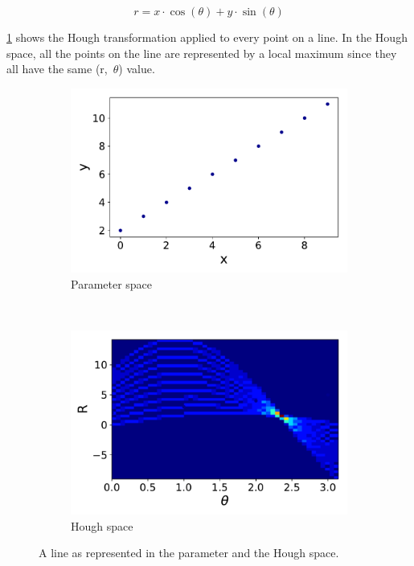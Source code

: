 \begin{equation}
	r = x \cdot \cos(\theta) + y \cdot \sin(\theta)
	\label{line_hesse}
\end{equation}

\cref{HTLine} shows the Hough transformation applied to every point on a line. In the Hough space, all the points on the line are represented by a local maximum since they all have the same (r,~$\theta$) value.
\begin{figure}[ht]
	\centering
	\begin{subfigure}[b]{0.45\textwidth}
        \includegraphics[width=\textwidth]{figures/line.pdf}
        \caption{Parameter space}
    \end{subfigure}
		~ %
		\begin{subfigure}[b]{0.45\textwidth}
					\includegraphics[width=\textwidth]{figures/line_hough.pdf}
					\caption{Hough space}
			\end{subfigure}
	\label{HTLine}
	\caption{A line as represented in the parameter and the Hough space.}
\end{figure}

